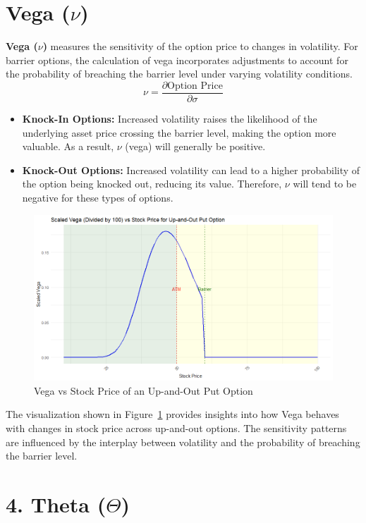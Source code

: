 \section{Vega (\(\nu\))}

\textbf{Vega (\(\nu\))} measures the sensitivity of the option price to changes in volatility. For barrier options, the calculation of vega incorporates adjustments to account for the probability of breaching the barrier level under varying volatility conditions.
\[
\nu = \frac{\partial \text{Option Price}}{\partial \sigma}
\]

\begin{itemize}
    \item \textbf{Knock-In Options:} Increased volatility raises the likelihood of the underlying asset price crossing the barrier level, making the option more valuable. As a result, \(\nu\) (vega) will generally be positive.
    \item \textbf{Knock-Out Options:} Increased volatility can lead to a higher probability of the option being knocked out, reducing its value. Therefore, \(\nu\) will tend to be negative for these types of options.
\end{itemize}

\begin{figure}[h]
    \centering
    \includegraphics[width=.65\linewidth]{content/images/vega.png}
    \caption{Vega vs Stock Price of an Up-and-Out Put Option}
    \label{fig:vega_behavior}
\end{figure}

The visualization shown in Figure~\ref{fig:vega_behavior} provides insights into how Vega behaves with changes in stock price across up-and-out options. The sensitivity patterns are influenced by the interplay between volatility and the probability of breaching the barrier level.




\section{4. Theta (\(\Theta\))}

